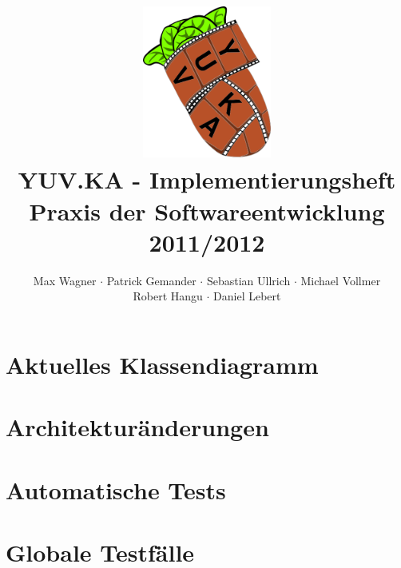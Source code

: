 \documentclass{scrartcl}
\begin{document}
\title{
    \hspace{-0.5cm} \includegraphics[height=5cm]{../../pflichtenheft/resources/logo.png} \\[1cm]
    \Huge{YUV.KA - Implementierungsheft} \\ \large{Praxis der Softwareentwicklung 2011/2012}
}
\author{Max Wagner $\cdot$ Patrick Gemander $\cdot$ Sebastian Ullrich $\cdot$ Michael Vollmer \\ Robert Hangu $\cdot$ Daniel Lebert}
\maketitle

\newpage
\mbox{}
\newpage
\mbox{}

\tableofcontents
\clearpage

\section{Aktuelles Klassendiagramm}

\clearpage

\section{Architekturänderungen}

\clearpage

\section{Automatische Tests}

\clearpage

\section{Globale Testfälle}

\clearpage


\end{document}
